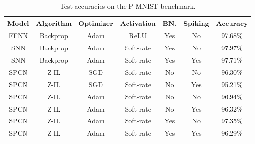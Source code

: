 \documentclass[a4paper,11pt]{article} %
\begin{document}
\begin{table}[ht]
  \centering
  \begin{tabular}{|c | c | c | c | c | c | c |}
  \hline
  \textbf{Model}          & \textbf{Algorithm}        & \textbf{Optimizer}    & \textbf{Activation}         & \textbf{BN.}          & \textbf{Spiking}   & \textbf{Accuracy}      \\ \hline
   FFNN                   & Backprop                  & Adam                  & ReLU                        & Yes                   & No                 & 97.68\%                \\
   SNN                    & Backprop                  & Adam                  & Soft-rate                   & Yes                   & No                 & 97.97\%                \\
   SNN                    & Backprop                  & Adam                  & Soft-rate                   & Yes                   & Yes                & 97.71\%                \\ 
   SPCN                   & Z-IL                      & SGD                   & Soft-rate                   & No                    & No                 & 96.30\%                \\
   SPCN                   & Z-IL                      & SGD                   & Soft-rate                   & No                    & Yes                & 95.21\%                \\
   SPCN                   & Z-IL                      & Adam                  & Soft-rate                   & No                    & No                 & 96.94\%                \\ 
   SPCN                   & Z-IL                      & Adam                  & Soft-rate                   & No                    & Yes                & 96.32\%                \\ 
   SPCN                   & Z-IL                      & Adam                  & Soft-rate                   & Yes                   & No                 & 97.35\%                \\
   SPCN                   & Z-IL                      & Adam                  & Soft-rate                   & Yes                   & Yes                & 96.29\%                \\ 
    \hline
  \end{tabular}
  \caption{Test accuracies on the P-MNIST benchmark.}
  \label{fig:snn-accuracies}
\end{table} \\
\end{document}
